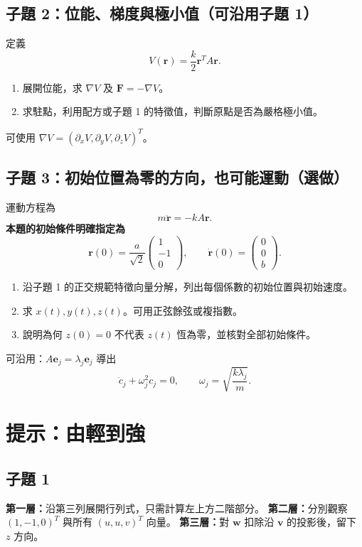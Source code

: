 \documentclass[12pt,a4paper]{article}
\begin{document}
\subsection*{子題 2：位能、梯度與極小值（可沿用子題 1）}
定義
\[
  V(\mathbf r)=\frac{k}{2}\mathbf r^TA\mathbf r.
\]
\begin{enumerate}
  \item 展開位能，求 \(\nabla V\) 及 \(\mathbf F=-\nabla V\)。
  \item 求駐點，利用配方或子題 1 的特徵值，判斷原點是否為嚴格極小值。
\end{enumerate}
可使用 \(\nabla V=(\partial_xV,\partial_yV,\partial_zV)^T\)。

\subsection*{子題 3：初始位置為零的方向，也可能運動（選做）}
運動方程為
\[
  m\ddot{\mathbf r}=-kA\mathbf r.
\]
\textbf{本題的初始條件明確指定為}
\[
  \mathbf r(0)=\frac a{\sqrt2}\begin{pmatrix}1\\-1\\0\end{pmatrix},\qquad
  \dot{\mathbf r}(0)=\begin{pmatrix}0\\0\\b\end{pmatrix}.
\]
\begin{enumerate}
  \item 沿子題 1 的正交規範特徵向量分解，列出每個係數的初始位置與初始速度。
  \item 求 \(x(t),y(t),z(t)\)。可用正弦餘弦或複指數。
  \item 說明為何 \(z(0)=0\) 不代表 \(z(t)\) 恆為零，並核對全部初始條件。
\end{enumerate}
可沿用：\(A\mathbf e_j=\lambda_j\mathbf e_j\) 導出
\[
  \ddot c_j+\omega_j^2c_j=0,\qquad \omega_j=\sqrt{\frac{k\lambda_j}{m}}.
\]

\clearpage
\section{提示：由輕到強}
\subsection*{子題 1}
\textbf{第一層：}沿第三列展開行列式，只需計算左上方二階部分。
\textbf{第二層：}分別觀察 \((1,-1,0)^T\) 與所有 \((u,u,v)^T\) 向量。
\textbf{第三層：}對 \(\mathbf w\) 扣除沿 \(\mathbf v\) 的投影後，留下 \(z\) 方向。
\end{document}
